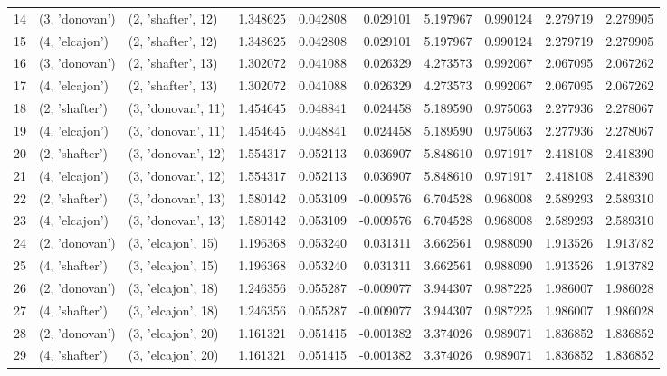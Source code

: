 \begin{tabular}{lllrrrrrrr}
14 &   (3, 'donovan') &  (2, 'shafter', 12) &  1.348625 &  0.042808 &  0.029101 &   5.197967 &  0.990124 &  2.279719 &  2.279905 \\
15 &   (4, 'elcajon') &  (2, 'shafter', 12) &  1.348625 &  0.042808 &  0.029101 &   5.197967 &  0.990124 &  2.279719 &  2.279905 \\
16 &   (3, 'donovan') &  (2, 'shafter', 13) &  1.302072 &  0.041088 &  0.026329 &   4.273573 &  0.992067 &  2.067095 &  2.067262 \\
17 &   (4, 'elcajon') &  (2, 'shafter', 13) &  1.302072 &  0.041088 &  0.026329 &   4.273573 &  0.992067 &  2.067095 &  2.067262 \\
18 &   (2, 'shafter') &  (3, 'donovan', 11) &  1.454645 &  0.048841 &  0.024458 &   5.189590 &  0.975063 &  2.277936 &  2.278067 \\
19 &   (4, 'elcajon') &  (3, 'donovan', 11) &  1.454645 &  0.048841 &  0.024458 &   5.189590 &  0.975063 &  2.277936 &  2.278067 \\
20 &   (2, 'shafter') &  (3, 'donovan', 12) &  1.554317 &  0.052113 &  0.036907 &   5.848610 &  0.971917 &  2.418108 &  2.418390 \\
21 &   (4, 'elcajon') &  (3, 'donovan', 12) &  1.554317 &  0.052113 &  0.036907 &   5.848610 &  0.971917 &  2.418108 &  2.418390 \\
22 &   (2, 'shafter') &  (3, 'donovan', 13) &  1.580142 &  0.053109 & -0.009576 &   6.704528 &  0.968008 &  2.589293 &  2.589310 \\
23 &   (4, 'elcajon') &  (3, 'donovan', 13) &  1.580142 &  0.053109 & -0.009576 &   6.704528 &  0.968008 &  2.589293 &  2.589310 \\
24 &   (2, 'donovan') &  (3, 'elcajon', 15) &  1.196368 &  0.053240 &  0.031311 &   3.662561 &  0.988090 &  1.913526 &  1.913782 \\
25 &   (4, 'shafter') &  (3, 'elcajon', 15) &  1.196368 &  0.053240 &  0.031311 &   3.662561 &  0.988090 &  1.913526 &  1.913782 \\
26 &   (2, 'donovan') &  (3, 'elcajon', 18) &  1.246356 &  0.055287 & -0.009077 &   3.944307 &  0.987225 &  1.986007 &  1.986028 \\
27 &   (4, 'shafter') &  (3, 'elcajon', 18) &  1.246356 &  0.055287 & -0.009077 &   3.944307 &  0.987225 &  1.986007 &  1.986028 \\
28 &   (2, 'donovan') &  (3, 'elcajon', 20) &  1.161321 &  0.051415 & -0.001382 &   3.374026 &  0.989071 &  1.836852 &  1.836852 \\
29 &   (4, 'shafter') &  (3, 'elcajon', 20) &  1.161321 &  0.051415 & -0.001382 &   3.374026 &  0.989071 &  1.836852 &  1.836852 \\

\end{tabular}
